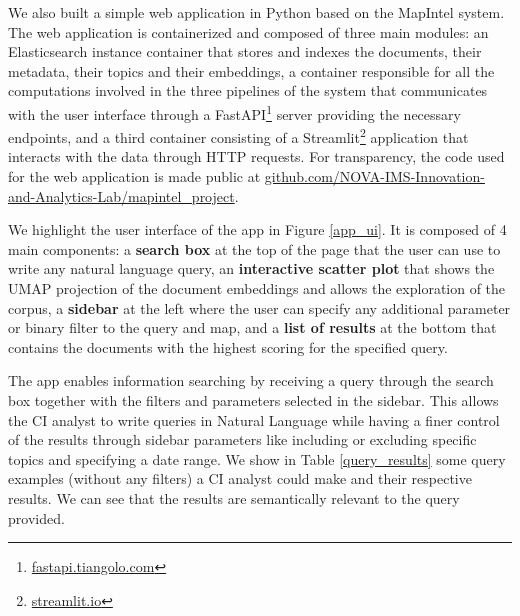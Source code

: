 \documentclass[a4paper]{article}
\begin{document}
We also built a simple web application in Python based on the MapIntel system. The web application is containerized and composed of three main modules: an Elasticsearch instance container that stores and indexes the documents, their metadata, their topics and their embeddings, a container responsible for all the computations involved in the three pipelines of the system that communicates with the user interface through a FastAPI\footnote{\href{https://fastapi.tiangolo.com/}{fastapi.tiangolo.com}} server providing the necessary endpoints, and a third container consisting of a Streamlit\footnote{\href{https://streamlit.io/}{streamlit.io}} application that interacts with the data through HTTP requests. For transparency, the code used for the web application is made public at \href{https://github.com/NOVA-IMS-Innovation-and-Analytics-Lab/mapintel_project}{github.com/NOVA-IMS-Innovation-and-Analytics-Lab/mapintel\_project}.

We highlight the user interface of the app in Figure \ref{app_ui}. It is composed of 4 main components: a \textbf{search box} at the top of the page that the user can use to write any natural language query, an \textbf{interactive scatter plot} that shows the UMAP projection of the document embeddings and allows the exploration of the corpus, a \textbf{sidebar} at the left where the user can specify any additional parameter or binary filter to the query and map, and a \textbf{list of results} at the bottom that contains the documents with the highest scoring for the specified query.

The app enables information searching by receiving a query through the search box together with the filters and parameters selected in the sidebar. This allows the CI analyst to write queries in Natural Language while having a finer control of the results through sidebar parameters like including or excluding specific topics and specifying a date range. We show in Table \ref{query_results} some query examples (without any filters) a CI analyst could make and their respective results. We can see that the results are semantically relevant to the query provided.
\end{document}
